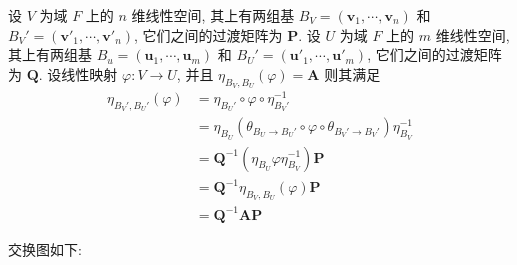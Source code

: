 \documentclass[UTF8]{book}
\begin{document}
\begin{theorem}
    设 $V$ 为域 $F$ 上的 $n$ 维线性空间, 其上有两组基 
    $B_V=(\boldsymbol{v}_1,\cdots,\boldsymbol{v}_n)$ 
    和 $B_V'=(\boldsymbol{v}'_1,\cdots,\boldsymbol{v}'_n)$, 
    它们之间的过渡矩阵为 $\boldsymbol{P}$. 
    设 $U$ 为域 $F$ 上的 $m$ 维线性空间, 其上有两组基 
    $B_u=(\boldsymbol{u}_1,\cdots,\boldsymbol{u}_m)$ 
    和 $B_U'=(\boldsymbol{u}'_1,\cdots,\boldsymbol{u}'_m)$, 
    它们之间的过渡矩阵为 $\boldsymbol{Q}$. 
    设线性映射 $\varphi : V \to U$, 并且 
    $\eta_{B_V,B_U}(\varphi) =\boldsymbol{A}$ 
    则其满足 
    $$\begin{aligned}
    \eta_{B_V',B_U'}(\varphi) 
    &=\eta_{B_U'} \circ  \varphi \circ \eta_{B_V'}^{-1}\\
    &= \eta_{B_U} (\theta_{B_U \to B_U'}\circ  \varphi \circ 
    \theta_{B_V' \to B_V'}) \eta_{B_V}^{-1}\\
    &= \boldsymbol{Q}^{-1}( \eta_{B_U} \varphi \eta_{B_V}^{-1} )
    \boldsymbol{P} \\
    &= \boldsymbol{Q}^{-1} \eta_{B_V,B_U}(\varphi)
    \boldsymbol{P} \\
    &= \boldsymbol{Q}^{-1}\boldsymbol{A}\boldsymbol{P} 
    \end{aligned}$$
    
    交换图如下: 
    \begin{center}
    \end{center}
    
\end{theorem}
\end{document}
